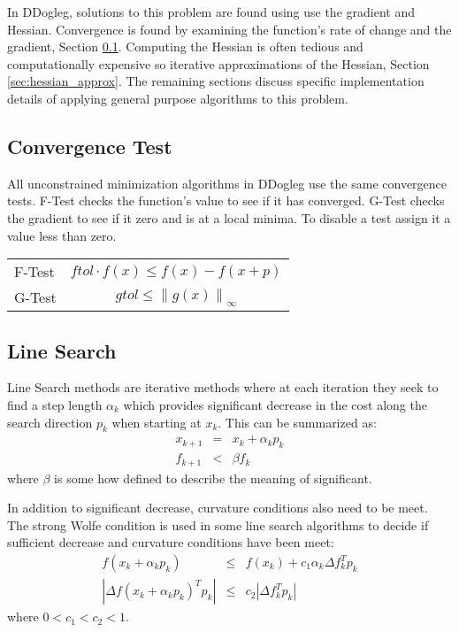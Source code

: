 \documentclass[peerreview,compsoc,onecolumn]{IEEEtran}
\newcommand{\norm}[1]{\left\lVert#1\right\rVert}
\begin{document}
In DDogleg, solutions to this problem are found using use the gradient and Hessian. Convergence is found by examining the function's rate of change and the gradient, Section \ref{sec:unmin_convergence}. Computing the Hessian is often tedious and computationally expensive so iterative approximations of the Hessian, Section \ref{sec:hessian_approx}. The remaining sections discuss specific implementation details of applying general purpose algorithms to this problem.

\subsection{Convergence Test}
\label{sec:unmin_convergence}

All unconstrained minimization algorithms in DDogleg use the same convergence tests. F-Test checks the function's value to see if it has converged. G-Test checks the gradient to see if it zero and is at a local minima. To disable a test assign it a value less than zero.

\begin{center}
\begin{tabular}{lc}
F-Test & $ftol \cdot f(x)  \leq f(x) - f(x+p)$ \\
G-Test & $gtol \leq \norm{g(x)}_\infty$ 
\end{tabular}
\end{center}
 
\subsection{Line Search}

Line Search methods are iterative methods where at each iteration they seek to find a step length $\alpha_k$ which provides significant decrease in the cost along the search direction $p_k$ when starting at $x_k$. This can be summarized as:
\begin{eqnarray}
x_{k+1} & = & x_k + \alpha_k p_k \\
f_{k+1} & < & \beta f_k
\end{eqnarray}
where $\beta$ is some how defined to describe the meaning of significant.

In addition to significant decrease, curvature conditions also need to be meet. The strong Wolfe condition is used in some line search algorithms to decide if sufficient decrease and curvature conditions have been meet:
\begin{eqnarray}
f(x_k + \alpha_k p_k) &\le& f(x_k) + c_1 \alpha_k \Delta f^T_k p_k \\
|\Delta f(x_k + \alpha_k p_k)^T p_k| &\le& c_2 |\Delta f_k^T p_k|
\end{eqnarray}
where $0 < c_1 < c_2 < 1$.
\end{document}
